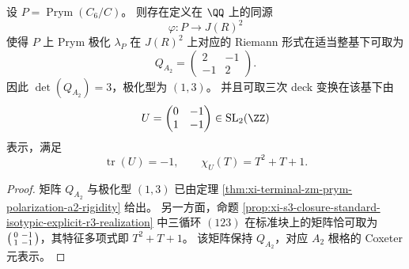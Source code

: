\begin{proposition}\label{prop:xi-terminal-zm-s3-endoscopic-prym-a2-coxeter}
设 \(P=\operatorname{Prym}(C_6/C)\)。
则存在定义在 \(\QQ\) 上的同源
\[
\varphi:P\longrightarrow J(R)^2
\]
使得 \(P\) 上 Prym 极化 \(\lambda_P\) 在 \(J(R)^2\) 上对应的 Riemann 形式在适当整基下可取为
\[
Q_{A_2}=
\begin{pmatrix}
2 & -1\\
-1 & 2
\end{pmatrix}.
\]
因此 \(\det(Q_{A_2})=3\)，极化型为 \((1,3)\)。
并且可取三次 deck 变换在该基下由
\[
U=
\begin{pmatrix}
0 & -1\\
1 & -1
\end{pmatrix}\in\mathrm{SL}_2(\ZZ)
\]
表示，满足
\[
\operatorname{tr}(U)=-1,\qquad \chi_U(T)=T^2+T+1.
\]
\end{proposition}
\begin{proof}
矩阵 \(Q_{A_2}\) 与极化型 \((1,3)\) 已由定理
\ref{thm:xi-terminal-zm-prym-polarization-a2-rigidity} 给出。
另一方面，命题 \ref{prop:xi-s3-closure-standard-isotypic-explicit-r3-realization} 中三循环 \((123)\) 在标准块上的矩阵恰可取为
\(
\begin{psmallmatrix}0&-1\\1&-1\end{psmallmatrix}
\)，其特征多项式即 \(T^2+T+1\)。
该矩阵保持 \(Q_{A_2}\)，对应 \(A_2\) 根格的 Coxeter 元表示。
\end{proof}

